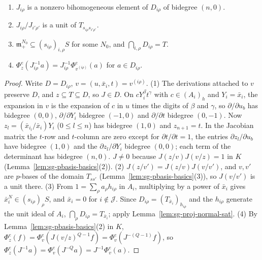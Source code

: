 \begin{lemma}\label{lem:sg-jacobians}
\leanok
{}
\begin{enumerate}
\item $J_{i\rho}$ is a nonzero bihomogeneous element of $D_{i\rho}$ of bidegree $(n,0)$.
\item $J_{i\rho}/J_{i'\rho'}$ is a unit of $T_{s_{i\rho}s_{i'\rho'}}$.
\item $\mathfrak m_+^{N_0}\subseteq(s_{i\rho})_{i,\rho}S$ for some $N_0$, and $\bigcap_{i,\rho}D_{i\rho}=T$.
\item $\Phi^e_z(J_{i\rho}^{-1}a)=J_{i\rho}^{-1}\Phi^e_{v^{(i\rho)}}(a)$ for $a\in D_{i\rho}$.
\end{enumerate}
\end{lemma}

\begin{proof}
Write $D=D_{i\rho}$, $v=(u,\bar x_i,t)=v^{(i\rho)}$. (1) The derivations attached to $v$ preserve $D$, and $z\subseteq T\subseteq D$, so $J\in D$. On
$cY_i^\beta t^\gamma$ with $c\in(A_i)_h$ and $Y_i=\bar x_i$, the expansion in $v$ is the expansion of $c$ in $u$ times the digits of $\beta$ and $\gamma$,
so $\partial/\partial u_b$ has bidegree $(0,0)$, $\partial/\partial Y_i$ bidegree $(-1,0)$ and $\partial/\partial t$ bidegree $(0,-1)$. Now
$z_l=(\bar x_{i_l}/\bar x_i)Y_i$ ($0\le l\le n$) has bidegree $(1,0)$ and $z_{n+1}=t$. In the Jacobian matrix the $t$-row and $t$-column are zero except
for $\partial t/\partial t=1$, the entries $\partial z_l/\partial u_b$ have bidegree $(1,0)$ and the $\partial z_l/\partial Y_i$ bidegree $(0,0)$; each term of the
determinant has bidegree $(n,0)$. $J\ne0$ because $J(z/v)J(v/z)=1$ in $K$ (Lemma~\ref{lem:sg-pbasis-basics}(2)).
(2) $J(z/v')=J(z/v)J(v/v')$, and $v,v'$ are $p$-bases of the domain $T_{ss'}$ (Lemma~\ref{lem:sg-pbasis-basics}(3)), so $J(v/v')$ is a unit there.
(3) From $1=\sum_\rho a_\rho h_{i\rho}$ in $A_i$, multiplying by a power of $\bar x_i$ gives $\bar x_i^{N}\in(s_{i\rho})_\rho S$, and $\bar x_i=0$ for
$i\notin\mathcal J$. Since $D_{i\rho}=(T_{\bar x_i})_{h_{i\rho}}$ and the $h_{i\rho}$ generate the unit ideal of $A_i$, $\bigcap_\rho D_{i\rho}=T_{\bar x_i}$; apply
Lemma~\ref{lem:sg-proj-normal-sat}.
(4) By Lemma~\ref{lem:sg-pbasis-basics}(2) in $K$, $\Phi^e_z(f)=\Phi^e_v(J(v/z)^{Q-1}f)=\Phi^e_v(J^{-(Q-1)}f)$, so
$\Phi^e_z(J^{-1}a)=\Phi^e_v(J^{-Q}a)=J^{-1}\Phi^e_v(a)$.
\end{proof}

